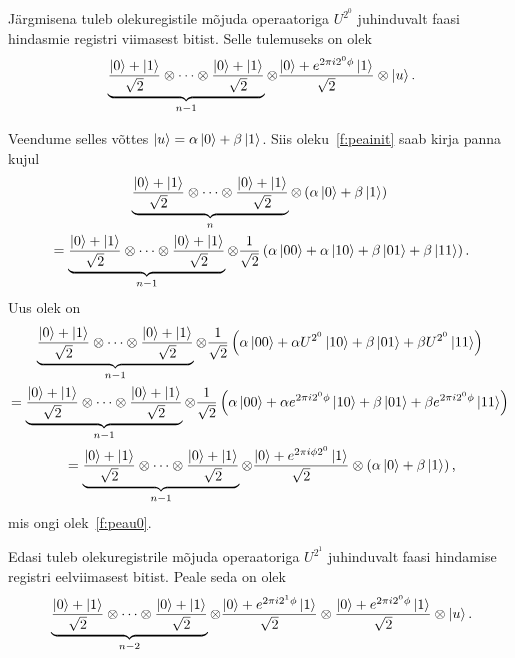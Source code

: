 \documentclass[12pt]{report}
\def\paren#1{\left(#1\right)}
\def\ket#1{\mathinner{|#1\rangle}}
\begin{document}
Järgmisena tuleb olekuregistile mõjuda operaatoriga \(U^{2^0}\) juhinduvalt faasi hindasmie registri viimasest bitist.
Selle tulemuseks on olek
\begin{align}\label{f:peau0}
    \underbrace{\frac{\ket{0}+\ket{1}}{\sqrt{2}}
    \otimes \cdots
    \otimes \frac{\ket{0}+\ket{1}}{\sqrt{2}}}_{n - 1}
    \otimes \frac{\ket{0}+e^{2\pi i2^0\phi}\ket{1}}{\sqrt{2}}
    \otimes \ket{u} \rlap{.}
\end{align}

Veendume selles võttes \(\ket{u} = \alpha\ket{0} + \beta\ket{1}\).
Siis oleku~\ref{f:peainit} saab kirja panna kujul
\begin{multline}
    \underbrace{\frac{\ket{0}+\ket{1}}{\sqrt{2}}
    \otimes \cdots
    \otimes \frac{\ket{0}+\ket{1}}{\sqrt{2}}}_n
    \otimes \paren{\alpha \ket{0} + \beta \ket{1}} \\
    = \underbrace{\frac{\ket{0}+\ket{1}}{\sqrt{2}}
    \otimes \cdots
    \otimes \frac{\ket{0}+\ket{1}}{\sqrt{2}}}_{n - 1}
    \otimes \frac{1}{\sqrt{2}} \paren{
        \alpha \ket{00} + \alpha \ket{10}
        + \beta \ket{01} + \beta \ket{11}
    } \rlap{.}
\end{multline}
Uus olek on
\begin{multline}
    \underbrace{\frac{\ket{0}+\ket{1}}{\sqrt{2}}
    \otimes \cdots
    \otimes \frac{\ket{0}+\ket{1}}{\sqrt{2}}}_{n - 1}
    \otimes \frac{1}{\sqrt{2}} \paren{
        \alpha \ket{00} + \alpha U^{2^0} \ket{10}
        + \beta \ket{01} + \beta U^{2^0} \ket{11}
    } \\
    = \underbrace{\frac{\ket{0}+\ket{1}}{\sqrt{2}}
    \otimes \cdots
    \otimes \frac{\ket{0}+\ket{1}}{\sqrt{2}}}_{n - 1}
    \otimes \frac{1}{\sqrt{2}} \paren{
        \alpha \ket{00} + \alpha e^{2\pi i2^0\phi} \ket{10}
        + \beta \ket{01} + \beta e^{2\pi i2^0\phi} \ket{11}
    } \\
    = \underbrace{\frac{\ket{0}+\ket{1}}{\sqrt{2}}
    \otimes \cdots
    \otimes \frac{\ket{0}+\ket{1}}{\sqrt{2}}}_{n - 1}
    \otimes \frac{\ket{0} + e^{2\pi i\phi 2^0} \ket{1}}{\sqrt{2}}
    \otimes \paren{\alpha \ket{0} + \beta \ket{1}} \rlap{,}
\end{multline}
mis ongi olek~\ref{f:peau0}.

Edasi tuleb olekuregistrile mõjuda operaatoriga \(U^{2^1}\) juhinduvalt faasi hindamise registri eelviimasest bitist.
Peale seda on olek
\begin{align}
    \underbrace{\frac{\ket{0} + \ket{1}}{\sqrt{2}}
    \otimes \cdots
    \otimes \frac{\ket{0} + \ket{1}}{\sqrt{2}}
    }_{n-2}
    \otimes \frac{\ket{0} + e^{2\pi i2^1\phi} \ket{1}}{\sqrt{2}}
    \otimes \frac{\ket{0} + e^{2\pi i2^0\phi} \ket{1}}{\sqrt{2}}
    \otimes \ket{u} \rlap{.}
\end{align}
\end{document}
